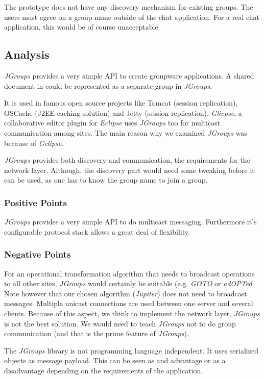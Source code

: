 The prototype does not have any discovery mechanism for existing groups. The users must agree on a group name outside of the chat application. For a real chat application, this would be of course unacceptable.


\subsection{Analysis}
\emph{JGroups} provides a very simple API to create groupware applications. A shared document in \ace could be represented as a separate group in \emph{JGroups}. 

It is used in famous open source projects like Tomcat (session replication), OSCache (J2EE caching solution) and Jetty (session replication). \emph{Glicpse}, a collaborative editor plugin for \emph{Eclipse} uses \emph{JGroups} too for multicast communication among sites. The main reason why we examined \emph{JGroups} was because of \emph{Gclipse}.

\emph{JGroups} provides both discovery and communication, the requirements for the network layer. Although, the discovery part would need some tweaking before it can be used, as one has to know the group name to join a group.

\subsubsection{Positive Points}
\emph{JGroups} provides a very simple API to do multicast messaging. Furthermore it's configurable protocol stack allows a great deal of flexibility.

\subsubsection{Negative Points}
For an operational transformation algorithm that needs to broadcast operations to all other sites, \emph{JGroups} would certainly be suitable (e.g. \emph{GOTO}  or \emph{adOPTed}. Note however that our chosen algorithm (\emph{Jupiter}) does not need to broadcast messages. Multiple unicast connections are used between one server and several clients. Because of this aspect, we think to implement the network layer, \emph{JGroups} is not the best solution. We would need to teach \emph{JGroups} not to do group communication (and that is the prime feature of \emph{JGroups}). 

The \emph{JGroups} library is not programming language independent. It uses serialized objects as message payload. This can be seen as and advantage or as a disadvantage depending on the requirements of the application.

